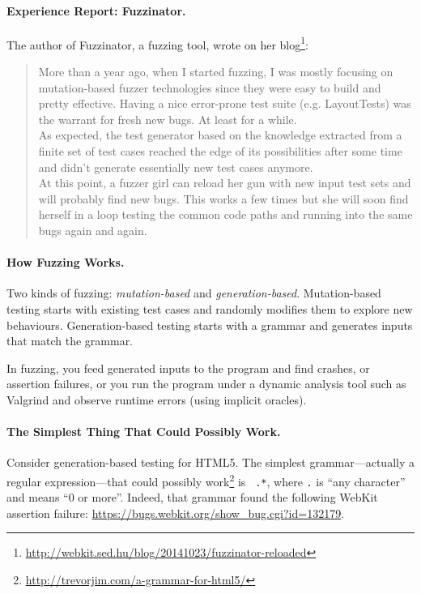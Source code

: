 \documentclass[11pt]{article}
\begin{document}
\paragraph{Experience Report: Fuzzinator.} The author of Fuzzinator, a fuzzing tool, wrote on her blog\footnote{\url{http://webkit.sed.hu/blog/20141023/fuzzinator-reloaded}}:

\begin{quote}
  More than a year ago, when I started fuzzing, I was mostly focusing on mutation-based fuzzer technologies since they were easy to build and pretty effective. Having a nice error-prone test suite (e.g. LayoutTests) was the warrant for fresh new bugs. At least for a while.\\[1em]

  As expected, the test generator based on the knowledge extracted from a finite set of test cases reached the edge of its possibilities after some time and didn't generate essentially new test cases anymore.\\[1em]

  At this point, a fuzzer girl can reload her gun with new input test sets and will probably find new bugs. This works a few times but she will soon find herself in a loop testing the common code paths and running into the same bugs again and again.
\end{quote}

\paragraph{How Fuzzing Works.} 
Two kinds of fuzzing: \emph{mutation-based} and
\emph{generation-based}. Mutation-based testing starts with
existing test cases and randomly modifies them to explore new behaviours.
Generation-based testing starts with a grammar and generates
inputs that match the grammar.

In fuzzing, you feed generated inputs to the program and find
crashes, or assertion failures, or you run the program under a dynamic
analysis tool such as Valgrind and observe runtime errors (using implicit oracles).

\paragraph{The Simplest Thing That Could Possibly Work.}
Consider generation-based testing for HTML5.  The simplest grammar---actually a regular
expression---that could possibly
work\footnote{\url{http://trevorjim.com/a-grammar-for-html5/}} is {\tt
  .*}, where {\tt .} is ``any character'' and {\tt *} means ``0 or
more''. Indeed, that grammar found the following WebKit assertion failure:
\url{https://bugs.webkit.org/show_bug.cgi?id=132179}.
\end{document}

